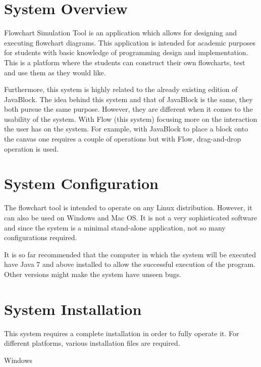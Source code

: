 \documentclass[11pt,a4paper,titlepage]{article}
\begin{document}

\newpage
\tableofcontents
{}
\newpage
{}
\section{System Overview}
	
		Flowchart Simulation Tool is an application which allows for designing and executing flowchart diagrams. This application is intended for academic purposes for students with basic knowledge of programming design and implementation. This is a platform where the students can construct their own flowcharts, test and use them as they would like. \newline
		
		Furthermore, this system is highly related to the already existing edition of JavaBlock. The idea behind this system and that of JavaBlock is the same, they both pursue the same purpose. However, they are different when it comes to the usability of the system. With Flow (this system) focusing more on the interaction the user has on the system. For example, with JavaBlock to place a block onto the canvas one requires a couple of operations but with Flow, drag-and-drop operation is used. 
		
\section{System Configuration}
		
		
		The flowchart tool is intended to operate on any Linux distribution. However, it can also be used on Windows and Mac OS. It is not a very sophisticated software and since the system is a minimal stand-alone application, not so many configurations required. 
		
		It is so far recommended that the computer in which the system will be executed have Java 7 and above installed to allow the successful execution of the program. Other versions might make the system have unseen bugs.
		
\section{System Installation}
		
		This system requires a complete installation in order to fully operate it. For different platforms, various installation files are required. \newline
		
		\begin{center}
		Windows
		\end{center}
		
\end{document}
